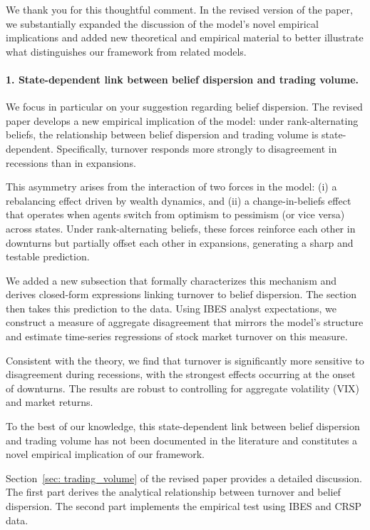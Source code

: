 \documentclass[12pt,a4paper]{article}
\begin{document}
We thank you for this thoughtful comment. In the revised version of the paper, we
substantially expanded the discussion of the model's novel empirical implications and
added new theoretical and empirical material to better illustrate what distinguishes
our framework from related models.

\paragraph{1. State-dependent link between belief dispersion and trading volume.}

We focus in particular on your suggestion regarding belief dispersion.
The revised paper develops a new empirical implication of the model:
under rank-alternating beliefs, the relationship between belief dispersion
and trading volume is state-dependent.
Specifically, turnover responds more strongly to disagreement in recessions
than in expansions.

This asymmetry arises from the interaction of two forces in the model:
(i) a rebalancing effect driven by wealth dynamics, and
(ii) a change-in-beliefs effect that operates when agents switch from
optimism to pessimism (or vice versa) across states.
Under rank-alternating beliefs, these forces reinforce each other in downturns
but partially offset each other in expansions, generating a sharp
and testable prediction.

We added a new subsection that formally characterizes this mechanism
and derives closed-form expressions linking turnover to belief dispersion.
The section then takes this prediction to the data.
Using IBES analyst expectations, we construct a measure of aggregate disagreement
that mirrors the model’s structure and estimate time-series regressions
of stock market turnover on this measure.

Consistent with the theory, we find that turnover is significantly more
sensitive to disagreement during recessions,
with the strongest effects occurring at the onset of downturns.
The results are robust to controlling for aggregate volatility (VIX)
and market returns.

To the best of our knowledge, this state-dependent link between belief dispersion
and trading volume has not been documented in the literature and constitutes
a novel empirical implication of our framework.

Section~\ref{sec: trading_volume} of the revised paper provides a detailed
discussion. The first part derives the analytical relationship between turnover
and belief dispersion. The second part implements the empirical test
using IBES and CRSP data.
\end{document}
